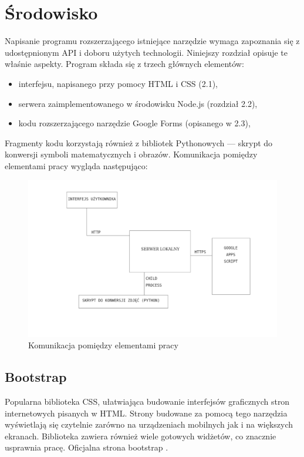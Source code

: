 \chapter{Środowisko} 
Napisanie programu rozszerzającego istniejące narzędzie wymaga zapoznania się z udostępnionym API i doboru użytych technologii. Niniejszy rozdział opisuje te właśnie aspekty.
\ind Program składa się z trzech głównych elementów:
\begin{itemize}
\item interfejsu, napisanego przy pomocy HTML i CSS (2.1),
\item serwera zaimplementowanego w środowisku Node.js (rozdział 2.2),
\item kodu rozszerzającego narzędzie Google Forms (opisanego w 2.3),
\end{itemize}
\ind Fragmenty kodu korzystają również z bibliotek Pythonowych --- skrypt do konwersji symboli matematycznych i obrazów.
\ind Komunikacja pomiędzy elementami pracy wygląda następująco:
\begin{figure}[H]
  \includegraphics[scale=0.75]{schemat.png}
  \caption{Komunikacja pomiędzy elementami pracy}
  \label{fig:1}
\end{figure}

\section{Bootstrap}  
Popularna biblioteka CSS, ułatwiająca budowanie interfejsów graficznych stron internetowych pisanych w HTML. Strony budowane za pomocą tego narzędzia wyświetlają się czytelnie zarówno na urządzeniach mobilnych jak i na większych ekranach. Biblioteka zawiera również wiele gotowych widżetów, co znacznie usprawnia pracę.
Oficjalna strona bootstrap \cite{bootstrap}.



